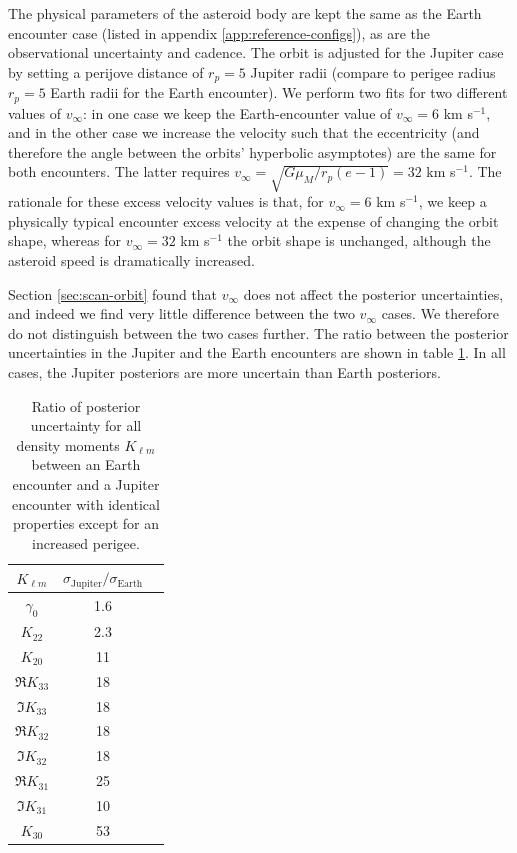 \documentclass[fleqn,usenatbib]{mnras}
\begin{document}
The physical parameters of the asteroid body are kept the same as the Earth encounter case (listed in appendix \ref{app:reference-configs}), as are the observational uncertainty and cadence. The orbit is adjusted for the Jupiter case by setting a perijove distance of $r_p=5$ Jupiter radii (compare to perigee radius $r_p=5$ Earth radii for the Earth encounter). We perform two fits for two different values of $v_\infty$: in one case we keep the Earth-encounter value of $v_\infty = 6$ km s$^{-1}$, and in the other case we increase the velocity such that the eccentricity (and therefore the angle between the orbits' hyperbolic asymptotes) are the same for both encounters. The latter requires $v_\infty = \sqrt{G\mu_M/r_p (e-1)}=32$ km s$^{-1}$. The rationale for these excess velocity values is that, for $v_\infty = 6$ km s$^{-1}$, we keep a physically typical encounter excess velocity at the expense of changing the orbit shape, whereas for $v_\infty =32$ km s$^{-1}$ the orbit shape is unchanged, although the asteroid speed is dramatically increased.

Section \ref{sec:scan-orbit} found that $v_\infty$ does not affect the posterior uncertainties, and indeed we find very little difference between the two $v_\infty$ cases. We therefore do not distinguish between the two cases further. The ratio between the posterior uncertainties in the Jupiter and the Earth encounters are shown in table \ref{tab:jupiter-uncertainty}. In all cases, the Jupiter posteriors are more uncertain than Earth posteriors.

\begin{table}
  \centering
  \begin{tabular}{c|cc}
    \hline 
    $K_{\ell m}$ & $\sigma_\text{Jupiter}/\sigma_\text{Earth}$\\ \hline 
    $\gamma_0$ & 1.6 \\
    $K_{22}$ & 2.3 \\
    $K_{20}$ & 11 \\
    $\Re K_{33}$ & 18 \\
    $\Im K_{33}$ & 18 \\
    $\Re K_{32}$ & 18 \\
    $\Im K_{32}$ & 18 \\
    $\Re K_{31}$ & 25 \\
    $\Im K_{31}$ & 10 \\
    $K_{30}$ & 53 \\ \hline
  \end{tabular}
  \caption{Ratio of posterior uncertainty for all density moments $K_{\ell m}$ between an Earth encounter and a Jupiter encounter with identical properties except for an increased perigee.}
  \label{tab:jupiter-uncertainty}
\end{table}
\end{document}
